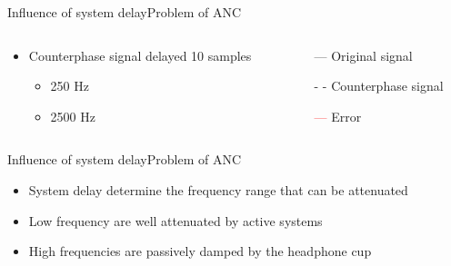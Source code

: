 \begin{frame}{Influence of system delay}{Problem of ANC}		
	\begin{columns}
		\begin{column}{0.5\textwidth}
			\begin{itemize}
				\item Counterphase signal delayed 10 samples	
				\begin{itemize}
					\item 250 Hz
					\item 2500 Hz 
				\end{itemize}	
			\end{itemize}
			\vspace{-6.5mm}			
		\begin{center}
	 		
	 	\end{center}
		\end{column}
		\begin{column}{0.5\textwidth} 
		\begin{itemize}
			\item[\textcolor{MATLABblue}{---}] Original signal
			\item[\textcolor{MATLABblue}{- -}] Counterphase signal
			\item[\textcolor{red}{---}] Error
		\end{itemize}
		\begin{center}
	 		
	 	\end{center}
		\end{column}
	\end{columns}
\end{frame}

\begin{frame}{Influence of system delay}{Problem of ANC}		
	\begin{center}
	\begin{itemize}
	\item System delay determine the frequency range that can be attenuated
	\item Low frequency are well attenuated by active systems
	\item High frequencies are passively damped by the headphone cup 
	\end{itemize}
	\end{center}
\end{frame}


